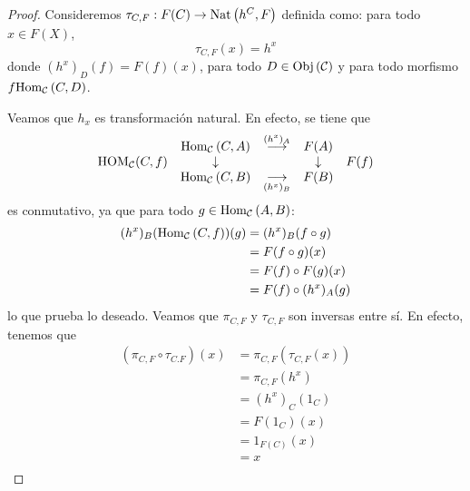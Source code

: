 \documentclass[12pt]{report}
\newcounter{it}
\theoremstyle{largebreak}
\newcommand\cf[3]{\ensuremath{#1:#2\rightarrow#3}}
\newcommand{\Obj}[1]{\ensuremath{\textup{Obj}\left(#1\right)}}
\newcommand{\Hom}[3]{\ensuremath{\textup{Hom}_{#1}\left(#2,#3\right)}}
\begin{document}
    \begin{proof}
        Consideremos $\cf{\tau_{ C,F}}{F(C)}{\Nat{h^C}{F}}$ definida como: para todo $x\in F(X)$,
        \begin{equation*}
            \tau_{ C,F}(x)=h^x
        \end{equation*}
        donde $(h^x)_D(f)=F(f)(x)$, para todo $D\in\Obj{\mathcal{C}}$ y para todo morfismo $f\Hom{\mathcal{C}}{C}{D}$.

        Veamos que $h_x$ es transformación natural. En efecto, se tiene que
        \begin{equation*}
            \begin{array}[pos]{rcccl}
                & \Hom{\mathcal{C}}{C}{A} & \overset{(h^x)_A}{\longrightarrow} & F(A) & \\
                \HOM{\mathcal{C}}(C,f) & \downarrow & & \downarrow & F(f) \\
               & \Hom{\mathcal{C}}{C}{B} & \underset{(h^x)_B}{\longrightarrow} & F(B) & \\
            \end{array}
        \end{equation*}
        es conmutativo, ya que para todo $g\in\Hom{\mathcal{C}}{A}{B}$:
        \begin{equation*}
            \begin{split}
                (h^x)_B(\Hom{\mathcal{C}}{C}{f})(g)&=(h^x)_B(f\circ g)\\
                &=F(f\circ g)(x)\\
                &=F(f)\circ F(g)(x)\\
                &=F(f)\circ (h^x)_A(g)\\
            \end{split}
        \end{equation*}
        lo que prueba lo deseado. Veamos que $\pi_{ C,F}$ y $\tau_{ C,F}$ son inversas entre sí. En efecto, tenemos que
        \begin{equation*}
            \begin{split}
                (\pi_{ C,F}\circ\tau_{ C.F})(x)&=\pi_{ C,F}(\tau_{ C,F}(x))\\
                &=\pi_{ C,F}(h^x)\\
                &=(h^x)_C(1_C)\\
                &=F(1_C)(x)\\
                &=1_{ F(C)}(x)\\
                &=x\\

\end{split}
\end{equation*}
\end{proof}
\end{document}
